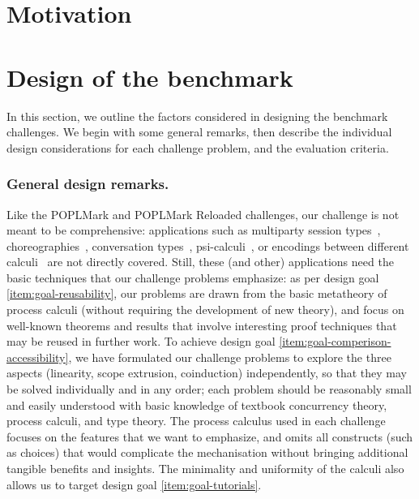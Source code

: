 \documentclass[runningheads]{llncs}
\begin{document}
\section{Motivation}\label{sec:motivation}

\section{Design of the benchmark}\label{sec:design-discussion}

In this section, we outline the factors considered in designing the
benchmark challenges. We begin with some general remarks, then
describe the individual design considerations for each challenge problem,
and the evaluation criteria.

\subsubsection{General design remarks.}
Like the POPLMark and POPLMark Reloaded challenges, our challenge is not meant to be comprehensive:
applications such as multiparty session types~\cite{10.1145/2827695,10.1145/3290343}, choreographies~\cite{DBLP:journals/jar/CruzFilipeMP23}, conversation types~\cite{DBLP:journals/tcs/CairesV10}, psi-calculi~\cite{lmcs:696}, or encodings between different calculi~\cite{DBLP:journals/iandc/Gorla10,DBLP:conf/forte/CairesP16,DBLP:journals/iandc/DardhaGS17,DBLP:conf/ecoop/ScalasDHY17,DBLP:journals/iandc/KouzapasPY19,10.1145/3479394.3479407} are not directly covered.  Still, these (and other) applications need the basic techniques that our challenge problems emphasize:
as per design goal \ref{item:goal-reusability},
our problems are drawn from the basic metatheory of process calculi (without requiring the development of new theory), and focus on well-known theorems
and results that involve interesting proof techniques that may be reused in further work.
To achieve design goal \ref{item:goal-comperison-accessibility},
we have formulated our challenge problems to explore the three aspects (linearity, scope extrusion, coinduction) independently, so that they may be solved individually and in any order;
each problem should be reasonably small and easily understood with basic knowledge of textbook concurrency theory, process calculi, and type theory.  The process calculus used in each challenge
focuses on the features that we want to emphasize, and omits all constructs
(such as choices) that would complicate the mechanisation without bringing additional tangible
benefits and insights. 
The minimality and uniformity of the calculi also allows us to target design
goal \ref{item:goal-tutorials}.
\end{document}
